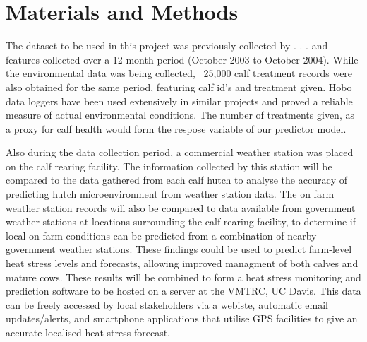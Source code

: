 \documentclass[12pt]{article}
\begin{document}
	\newpage
	\section{Materials and Methods}
		The dataset to be used in this project was previously collected by . . .  %
		and features collected over a 12 month period (October 2003 to October 2004). While the environmental data was being collected, ~25,000 calf treatment records were also obtained for the same period, featuring calf id's and treatment given. 
		Hobo data loggers have been used extensively in similar projects and proved a reliable measure of actual environmental conditions\cite{Scharf2011,Jousan2007}.
		The number of treatments given, as a proxy for calf health would form the respose variable of our predictor model. %

		Also during the data collection period, a commercial weather station was placed on the calf rearing facility. The information collected by this station will be compared to the data gathered from each calf hutch to analyse the accuracy of predicting hutch microenvironment from weather station data. 
		The on farm weather station records will also be compared to data available from government weather stations at locations surrounding the calf rearing facility, to determine if local on farm conditions can be predicted from a combination of nearby government weather stations. These findings could be used to predict farm-level heat stress levels and forecasts, allowing improved managment of both calves and mature cows.
		These results will be combined to form a heat stress monitoring and prediction software to be hosted on a server at the VMTRC, UC Davis. This data can be freely accessed by local stakeholders via a webiste, automatic email updates/alerts, and smartphone applications that utilise GPS facilities to give an accurate localised heat stress forecast.
	\newpage
	
	
\end{document}

